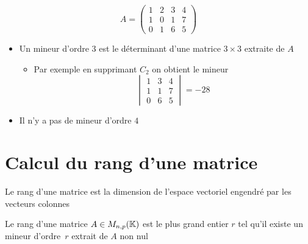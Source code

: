 \begin{frame}
\begin{exemple} 
$$A = 
\begin{pmatrix}
1&2&3&4\\
1&0&1&7\\
0&1&6&5
\end{pmatrix}$$

\begin{itemize} 
  \item\pause Un mineur d'ordre $3$ est le déterminant d'une matrice $3\times 3$ extraite de $A$
\begin{itemize}  
  \item\pause Par exemple en supprimant $C_2$ \pause on obtient
  le mineur
  \[
  \begin{vmatrix}
1&3&4\\
1&1&7\\
0&6&5
\end{vmatrix} = -28 
\]
\end{itemize}
  
  \item\pause Il n'y a pas de mineur d'ordre $4$

\end{itemize}
\end{exemple}
\end{frame}

\section{Calcul du rang d'une matrice}


\begin{frame}

\begin{mydefinition}
Le rang d'une matrice est la dimension de l'espace vectoriel engendré par les vecteurs colonnes
\end{mydefinition}

\bigskip
\pause
\begin{theoreme}
Le rang d'une matrice $A \in M_{n,p}(\mathbb{K})$ est le plus grand entier $r$ 
tel qu'il existe un mineur d'ordre~$r$ extrait de $A$ non nul
\end{theoreme}


\end{frame}


